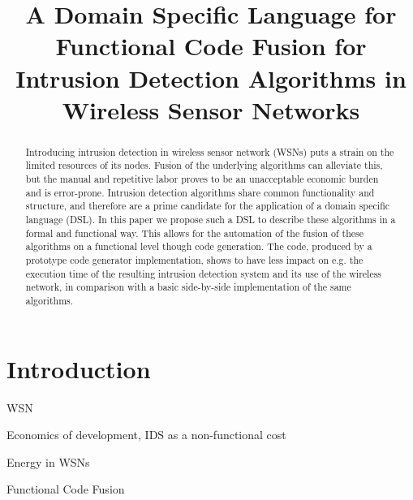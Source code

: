 \documentclass[conference]{IEEEtran}
\begin{document}
\expandafter\def\csname PY@tok@err\endcsname{}

\title{A Domain Specific Language for Functional Code Fusion for
       Intrusion Detection Algorithms in Wireless Sensor Networks}

\author{%
}

\maketitle

\begin{abstract}

Introducing intrusion detection in wireless sensor network (WSNs) puts a strain
on the limited resources of its nodes. Fusion of the underlying algorithms can
alleviate this, but the manual and repetitive labor proves to be an
unacceptable economic burden and is error-prone. Intrusion detection algorithms
share common functionality and structure, and therefore are a prime candidate
for the application of a domain specific language (DSL). In this paper we
propose such a DSL to describe these algorithms in a formal and functional way.
This allows for the automation of the fusion of these algorithms on a
functional level though code generation. The code, produced by a prototype code
generator implementation, shows to have less impact on e.g. the execution time
of the resulting intrusion detection system and its use of the wireless
network, in comparison with a basic side-by-side implementation of the same
algorithms.

\end{abstract}

\section{Introduction}

WSN \cite{baggio2005wireless,werner2005monitoring,hughes2006gridstix}

Economics of development, IDS as a non-functional cost \cite{lee2002toward}

Energy in WSNs \cite{hughes2013energy}

Functional Code Fusion
\end{document}
